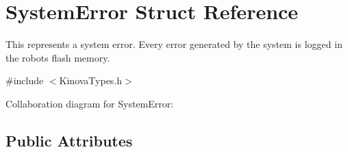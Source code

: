 \hypertarget{struct_system_error}{}\section{System\+Error Struct Reference}
\label{struct_system_error}


This represents a system error. Every error generated by the system is logged in the robot\textquotesingle{}s flash memory.  




{\ttfamily \#include $<$Kinova\+Types.\+h$>$}



Collaboration diagram for System\+Error\+:
\subsection*{Public Attributes}
